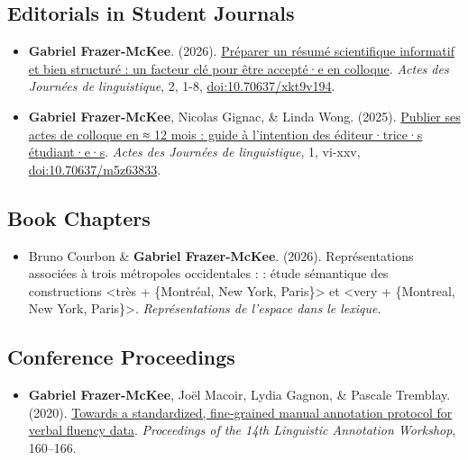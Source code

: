 \documentclass[
  canadian,
  10pt,
  letterpaper,
]{article}
\providecommand{\tightlist}{%
  \setlength{\itemsep}{0pt}\setlength{\parskip}{0pt}}
\begin{document}
\subsection{Editorials in Student
Journals}\label{editorials-in-student-journals}

\begin{itemize}
\tightlist
\item
  \textbf{Gabriel Frazer-McKee}. (2026).
  \href{https://doi.org/10.70637/xkt9v194}{Préparer un résumé
  scientifique informatif et bien structuré : un facteur clé pour être
  accepté·e en colloque}. \emph{Actes des Journées de linguistique}, 2,
  1-8, \href{https://doi.org/10.70637/xkt9v194}{doi:10.70637/xkt9v194}.
\item
  \textbf{Gabriel Frazer-McKee}, Nicolas Gignac, \& Linda Wong. (2025).
  \href{https://doi.org/10.70637/m5z63833}{Publier ses actes de colloque
  en ≈ 12 mois : guide à l'intention des éditeur·trice·s étudiant·e·s}.
  \emph{Actes des Journées de linguistique}, 1, vi-xxv,
  \href{https://doi.org/10.70637/m5z63833}{doi:10.70637/m5z63833}.
\end{itemize}

\subsection{Book Chapters}\label{book-chapters}

\begin{itemize}
\tightlist
\item
  Bruno Courbon \& \textbf{Gabriel Frazer-McKee}. (2026).
  Représentations associées à trois métropoles occidentales : : étude
  sémantique des constructions \textless très + \{Montréal, New York,
  Paris\}\textgreater{} et \textless very + \{Montreal, New York,
  Paris\}\textgreater. \emph{Représentations de l'espace dans le
  lexique}.
\end{itemize}

\subsection{Conference Proceedings}\label{conference-proceedings}

\begin{itemize}
\tightlist
\item
  \textbf{Gabriel Frazer-McKee}, Joël Macoir, Lydia Gagnon, \& Pascale
  Tremblay. (2020).
  \href{https://aclanthology.org/2020.law-1.15/}{Towards a standardized,
  fine-grained manual annotation protocol for verbal fluency data}.
  \emph{Proceedings of the 14th Linguistic Annotation Workshop},
  160--166.
\end{itemize}
\end{document}
